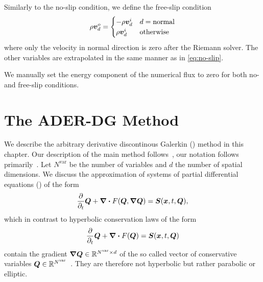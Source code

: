 Similarly to the no-slip condition, we define the free-slip condition
\begin{equation}
  \label{eq:free-slip}
  \rho \bm{v}^o_d = \begin{cases}
    -\rho \bm{v}^i_d & d = \text{normal} \\
    \rho \bm{v}^i_d & \text{otherwise}
    \end{cases}
\end{equation}
where only the velocity in normal direction is zero after the Riemann solver.
The other variables are extrapolated in the same manner as in \cref{eq:no-slip}.

We manually set the energy component of the numerical flux to zero for both no- and free-slip conditions.
\section{The ADER-DG Method}\label{sec:ader-dg}
\newcommand{\NVar}{N^{\text{var}}}
\newcommand{\dimensions}{d}
\newcommand{\mapping}{\mathcal{M}}
\newcommand{\volume}{V}
\newcommand{\cellCenter}{\operatorname{cell-center}}
We describe the arbitrary derivative discontinous Galerkin (\aderdg) method in this chapter.
Our description of the main method follows~\cite{dumbser2008unified,dumbser2010arbitrary,dumbser2018efficient}, our notation follows primarily~\cite{dumbser2018efficient}.
Let $\NVar$ be the number of variables and $\dimensions$ the number of spatial dimensions.
We discuss the approximation of systems of partial differential equations (\pde) of the form
\begin{equation}
  \label{eq:conservation-law-gradient}
 \frac{\partial}{\partial_t}  \Q + \div \flux(\Q, \gradQ) = \source(\bm{x}, t, \Q),
\end{equation}
which in contrast to hyperbolic conservation laws of the form
\begin{equation}
  \label{eq:conservation-law}
 \frac{\partial}{\partial_t}  \Q + \div \flux(\Q) = \source(\bm{x}, t, \Q)
\end{equation}
contain the gradient $\gradQ \in \mathbb{R}^{\NVar \times \dimensions}$ of the so called vector of conservative variables $\Q \in \mathbb{R}^{\NVar}$~\cite{dumbser2010arbitrary}.
They are therefore not hyperbolic but rather parabolic or elliptic.

